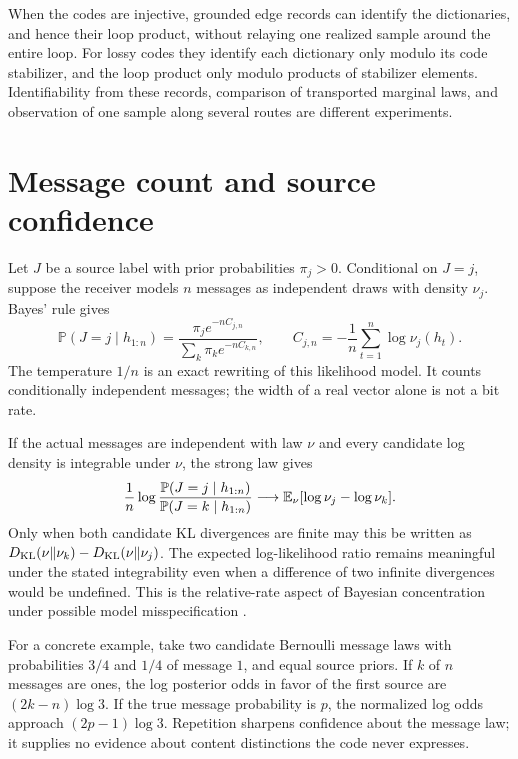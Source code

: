 When the codes are injective, grounded edge records can identify the dictionaries, and hence their loop product, without relaying one realized sample around the entire loop. For lossy codes they identify each dictionary only modulo its code stabilizer, and the loop product only modulo products of stabilizer elements. Identifiability from these records, comparison of transported marginal laws, and observation of one sample along several routes are different experiments.

\section{Message count and source confidence}

Let $J$ be a source label with prior probabilities $\pi_j>0$. Conditional on $J=j$, suppose the receiver models $n$ messages as independent draws with density $\nu_j$. Bayes' rule gives
\begin{equation}
\mathbb P(J=j\mid h_{1:n})
=\frac{\pi_j e^{-nC_{j,n}}}{\sum_k\pi_k e^{-nC_{k,n}}},
\qquad
C_{j,n}=-\frac1n\sum_{t=1}^n\log\nu_j(h_t).
\label{c17:source-posterior}
\end{equation}
The temperature $1/n$ is an exact rewriting of this likelihood model. It counts conditionally independent messages; the width of a real vector alone is not a bit rate.

If the actual messages are independent with law $\nu$ and every candidate log density is integrable under $\nu$, the strong law gives
\begin{equation}
\frac1n\log
\frac{\mathbb P(J=j\mid h_{1:n})}{\mathbb P(J=k\mid h_{1:n})}
\longrightarrow \mathbb E_\nu[\log\nu_j-\log\nu_k].
\label{c17:source-limit}
\end{equation}
Only when both candidate KL divergences are finite may this be written as $D_{\mathrm{KL}}(\nu\Vert\nu_k)-D_{\mathrm{KL}}(\nu\Vert\nu_j)$. The expected log-likelihood ratio remains meaningful under the stated integrability even when a difference of two infinite divergences would be undefined. This is the relative-rate aspect of Bayesian concentration under possible model misspecification \citep{Berk1966}.

For a concrete example, take two candidate Bernoulli message laws with probabilities $3/4$ and $1/4$ of message $1$, and equal source priors. If $k$ of $n$ messages are ones, the log posterior odds in favor of the first source are $(2k-n)\log3$. If the true message probability is $p$, the normalized log odds approach $(2p-1)\log3$. Repetition sharpens confidence about the message law; it supplies no evidence about content distinctions the code never expresses.

